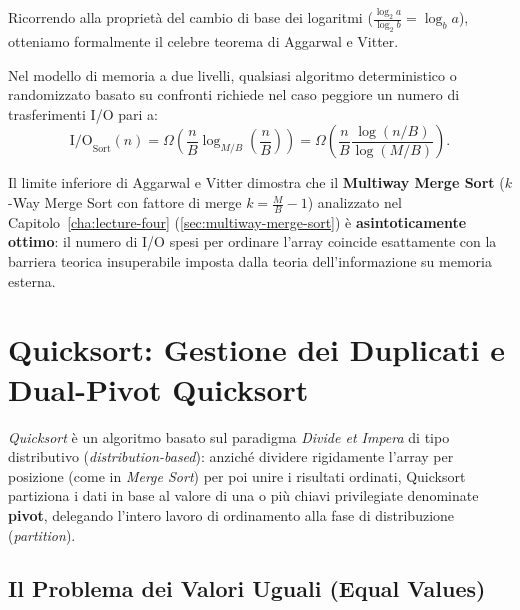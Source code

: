 Ricorrendo alla proprietà del cambio di base dei logaritmi ($\frac{\log_2 a}{\log_2 b} = \log_b a$), otteniamo formalmente il celebre teorema di Aggarwal e Vitter.

\begin{theorem}
\label{thm:aggarwal-vitter-bound}
Nel modello di memoria a due livelli, qualsiasi algoritmo deterministico o randomizzato basato su confronti richiede nel caso peggiore un numero di trasferimenti I/O pari a:
\begin{equation}
  \text{I/O}_{\text{Sort}}(n) = \Omega\left(\frac{n}{B} \log_{M/B}\left(\frac{n}{B}\right)\right) = \Omega\left(\frac{n}{B} \frac{\log(n / B)}{\log(M / B)}\right).
\end{equation}
\end{theorem}

\begin{property}
Il limite inferiore di Aggarwal e Vitter dimostra che il \textbf{Multiway Merge Sort} ($k$-Way Merge Sort con fattore di merge $k = \frac{M}{B} - 1$) analizzato nel Capitolo~\ref{cha:lecture-four} (\autoref{sec:multiway-merge-sort}) è \textbf{asintoticamente ottimo}: il numero di I/O spesi per ordinare l'array coincide esattamente con la barriera teorica insuperabile imposta dalla teoria dell'informazione su memoria esterna.
\end{property}

\FloatBarrier
\section{Quicksort: Gestione dei Duplicati e Dual-Pivot Quicksort}
\label{sec:quicksort-and-dual-pivot}

\textit{Quicksort} è un algoritmo basato sul paradigma \textit{Divide et Impera} di tipo distributivo (\textit{distribution-based}): anziché dividere rigidamente l'array per posizione (come in \textit{Merge Sort}) per poi unire i risultati ordinati, Quicksort partiziona i dati in base al valore di una o più chiavi privilegiate denominate \textbf{pivot}, delegando l'intero lavoro di ordinamento alla fase di distribuzione (\textit{partition}).

\FloatBarrier
\subsection{Il Problema dei Valori Uguali (Equal Values)}
\label{subsec:equal-values-problem}

